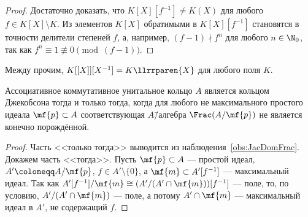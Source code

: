 \documentclass[
	extrafontsizes,
	11pt,
	hyphens,
]{memoir}
\begin{document}
\begin{proof}
Достаточно доказать, что \(K[X][f^{-1}] \neq K(X)\) для любого \(f \in K[X] \setminus K\).
Из элементов \(K[X]\) обратимыми в \(K[X][f^{-1}]\) становятся в точности делители степеней \(f\),
а, например, \((f-1) \nmid f^n\) для любого \(n \in \N_0\), так как \(f^n \equiv 1 \not\equiv 0 \pmod{(f-1)}\).
\end{proof}


\begin{example}
Между прочим, \(K[[X]][X^{-1}] = K\llrrparen{X}\) для любого поля \(K\).
\end{example}

\begin{theorem}
Ассоциативное коммутативное унитальное кольцо \(A\) является кольцом Джекобсона тогда и только тогда, когда\label{thm:JacRingCharFrac} для любого не максимального простого идеала \(\mf{p} \subset A\) соответствующая \(A\)\=/алгебра \(\Frac(A / \mf{p})\) не является конечно порождённой.
\end{theorem}

\begin{proof}
Часть <<только тогда>> выводится из наблюдения~\ref{obs:JacDomFrac}.
Докажем часть <<тогда>>.
Пусть \(\mf{p} \subset A\) --- простой идеал, \(A' \coloneqq A / \mf{p}\), \(f \in A' \setminus \{0\}\), а \(\mf{m} \subset A'[f^{-1}]\) --- максимальный идеал.
Так как \(A'[f^{-1}] / \mf{m} \cong (A' / (A' \cap \mf{m}))[f^{-1}]\) --- поле, то, по условию, \(A' / (A' \cap \mf{m})\) --- поле, а потому \(A' \cap \mf{m}\) --- максимальный идеал в \(A'\), не содержащий \(f\).
\end{proof}


\end{document}
